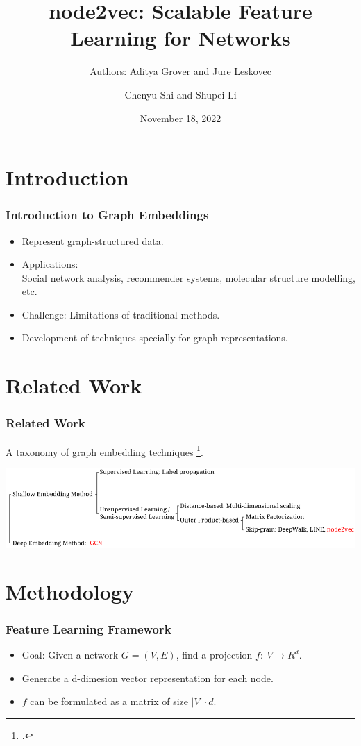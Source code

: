 \documentclass[10pt, aspectratio=169]{beamer}
\title{node2vec: Scalable Feature Learning for Networks}
\subtitle{Authors: Aditya Grover and Jure Leskovec}
\author{Chenyu Shi and Shupei Li}
\institute[LIACS]{Leiden Institute of Advanced Computer Science}
\date{November 18, 2022}
\begin{document}
\begin{frame}[plain]
	\titlepage
\end{frame}

\begin{frame}
	\tableofcontents
\end{frame}

\section{Introduction}
\begin{frame}
    \frametitle{Introduction to Graph Embeddings}
    \begin{itemize}
        \item Represent graph-structured data.
        \item Applications: \\
            Social network analysis, recommender systems, molecular structure modelling, etc.
        \item Challenge: Limitations of traditional methods.
        \item Development of techniques specially for graph representations.
    \end{itemize}
\end{frame}

\section{Related Work}
\begin{frame}
    \frametitle{Related Work}
    A taxonomy of graph embedding techniques \footcite{murphy2022}.
    \begin{center}
        \includegraphics[width=14cm]{./graphics/related-work.png}
    \end{center}
\end{frame}

\section{Methodology}
\begin{frame}
    \frametitle{Feature Learning Framework}
    \begin{itemize}
        \item Goal: Given a network $G=(V, E)$, find a projection $f:\ V \rightarrow R^d$.
        \item Generate a d-dimesion vector representation for each node.
        \item $f$ can be formulated as a matrix of size $\left| V \right| \cdot d$.
    \end{itemize}
\end{frame}
\end{document}
